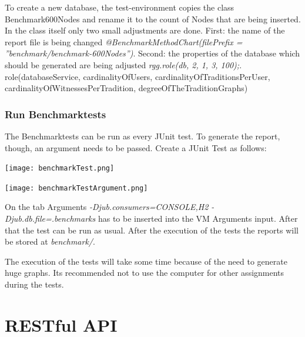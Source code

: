 \documentclass[11pt,fleqn,openany]{book} %
\begin{document}
To create a new database, the test-environment copies the class Benchmark600Nodes and rename it to the count of Nodes that are being inserted. In the class itself only two small adjustments are done. First: the name of the report file is being changed \textit{@BenchmarkMethodChart(filePrefix = ''benchmark/benchmark-600Nodes'')}. Second: the properties of the database which should be generated are being adjusted \textit{rgg.role(db, 2, 1, 3, 100);}. role(databaseService, cardinalityOfUsers, cardinalityOfTraditionsPerUser, cardinalityOfWitnessesPerTradition, degreeOfTheTraditionGraphs)

\section*{Run Benchmarktests}
The Benchmarktests can be run as every JUnit test. To generate the report, though, an argument needs to be passed. 
Create a JUnit Test as follows:

\begin{center}
\texttt{[image: benchmarkTest.png]} 
\end{center}

\begin{center}
\texttt{[image: benchmarkTestArgument.png]} 
\end{center}

On the tab Arguments \textit{-Djub.consumers=CONSOLE,H2 -Djub.db.file=.benchmarks} has to be inserted into the VM Arguments input. After that the test can be run as usual. After the execution of the tests the reports will be stored at \textit{benchmark/}.
 
\begin{remark}
The execution of the tests will take some time because of the need to generate huge graphs. Its recommended not to use the computer for other assignments during the tests.  
\end{remark}



\part{RESTful API}



\end{document}
